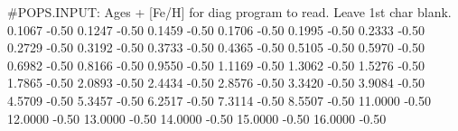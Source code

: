 #POPS.INPUT:  Ages + [Fe/H] for diag program to read. Leave 1st char blank.
    0.1067   -0.50
    0.1247   -0.50
    0.1459   -0.50
    0.1706   -0.50
    0.1995   -0.50
    0.2333   -0.50
    0.2729   -0.50
    0.3192   -0.50
    0.3733   -0.50
    0.4365   -0.50
    0.5105   -0.50
    0.5970   -0.50
    0.6982   -0.50
    0.8166   -0.50
    0.9550   -0.50
    1.1169   -0.50
    1.3062   -0.50
    1.5276   -0.50
    1.7865   -0.50
    2.0893   -0.50
    2.4434   -0.50
    2.8576   -0.50
    3.3420   -0.50
    3.9084   -0.50
    4.5709   -0.50
    5.3457   -0.50
    6.2517   -0.50
    7.3114   -0.50
    8.5507   -0.50
   11.0000   -0.50
   12.0000   -0.50
   13.0000   -0.50
   14.0000   -0.50
   15.0000   -0.50
   16.0000   -0.50

